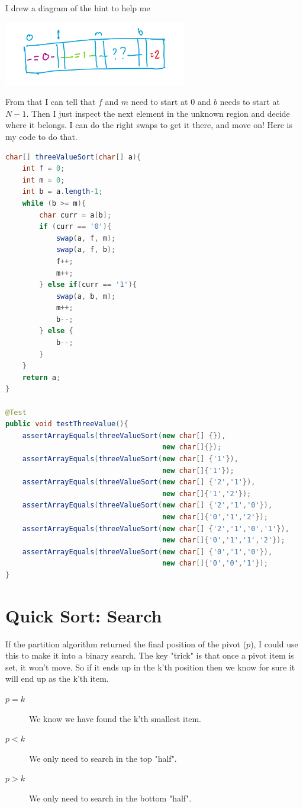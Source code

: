 \documentclass[twoside=false,DIV=14]{scrartcl}
\begin{document}
I drew a diagram of the hint to help me

\begin{center}
\includegraphics[width=0.6\textwidth]{three_value_sort.jpeg}
\end{center}

From that I can tell that $f$ and $m$ need to start at $0$ and $b$ needs to start at $N-1$.  Then I just inspect the next element in the unknown region and decide where it belongs.  I can do the right swaps to get it there, and move on!  Here is my code to do that.

{\small
\begin{lstlisting}[language=java]
char[] threeValueSort(char[] a){
    int f = 0;
    int m = 0;
    int b = a.length-1;
    while (b >= m){
        char curr = a[b];
        if (curr == '0'){
            swap(a, f, m);
            swap(a, f, b);
            f++;
            m++;
        } else if(curr == '1'){
            swap(a, b, m);
            m++;
            b--;
        } else {
            b--;
        }
    }
    return a;
}

@Test
public void testThreeValue(){
    assertArrayEquals(threeValueSort(new char[] {}), 
                                     new char[]{});
    assertArrayEquals(threeValueSort(new char[] {'1'}), 
                                     new char[]{'1'});
    assertArrayEquals(threeValueSort(new char[] {'2','1'}), 
                                     new char[]{'1','2'});
    assertArrayEquals(threeValueSort(new char[] {'2','1','0'}), 
                                     new char[]{'0','1','2'});
    assertArrayEquals(threeValueSort(new char[] {'2','1','0','1'}), 
                                     new char[]{'0','1','1','2'});
    assertArrayEquals(threeValueSort(new char[] {'0','1','0'}), 
                                     new char[]{'0','0','1'});
}
\end{lstlisting}
}

\section{Quick Sort: Search}

If the partition algorithm returned the final position of the pivot ($p$), I could use this to make it into a binary search.  The key "trick" is that once a pivot item is set, it won't move. So if it ends up in the k'th position then we know for sure it will end up as the k'th item.
\begin{description}
\item [$p = k$] We know we have found the k'th smallest item.
\item [$p < k$] We only need to search in the top "half".
\item [$p > k$] We only need to search in the bottom "half".
\end{description}
\end{document}
